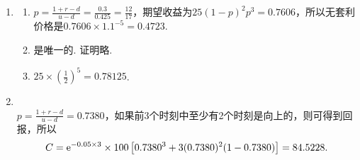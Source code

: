 \begin{enumerate}[label=\arabic{section}.\arabic*]
    \item \sol
    \begin{enumerate}[label=\alph*)]
        \item $\displaystyle p=\frac{1+r-d}{u-d}=\frac{0.3}{0.425}=\frac{12}{17}$，期望收益为$25(1-p)^2p^3=0.7606$，所以无套利价格是$0.7606\times 1.1^{-5}=0.4723$.
        \item 是唯一的. 证明略.
        \item $\displaystyle 25 \times \left(\frac{1}{2}\right)^5=0.78125$.
    \end{enumerate}
    \item \sol\\
    $\displaystyle p=\frac{1+r-d}{u-d}=0.7380$，如果前3个时刻中至少有2个时刻是向上的，则可得到回报，所以
    \[C=\mathrm{e}^{-0.05 \times 3}\times 100 \left[0.7380^3+3(0.7380)^2(1-0.7380)\right]=84.5228.\]
\end{enumerate}
\clearpage